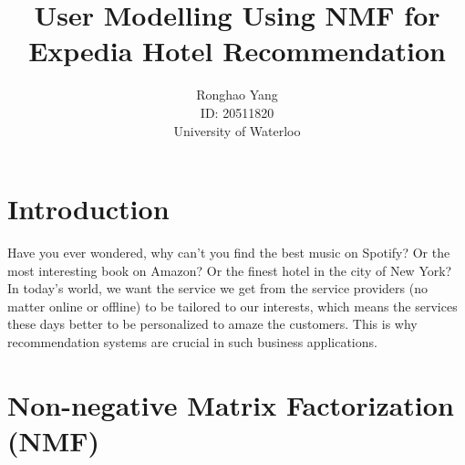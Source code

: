 \documentclass[11pt]{article} %
\title{User Modelling Using NMF for Expedia Hotel Recommendation}
\author{Ronghao Yang\\ID: 20511820\\University of Waterloo}
\begin{document}
\maketitle

\begin{abstract}

\end{abstract}
\section{Introduction}
Have you ever wondered, why can't you find the best music on Spotify? Or the most interesting book on Amazon? Or the finest hotel in the city of New York? In today's world, we want the service we get from the service providers (no matter online or offline) to be tailored to our interests, which means the services these days better to be personalized to amaze the customers. This is why recommendation systems are crucial in such business applications.
\section{Non-negative Matrix Factorization (NMF)}
\end{document}
